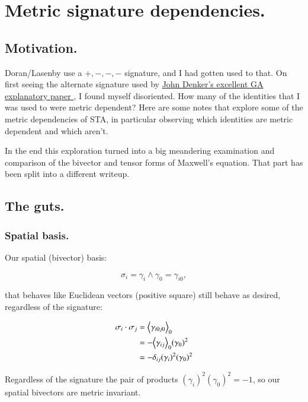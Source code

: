 \chapter{Metric signature dependencies.}

\section{Motivation. }

Doran/Lasenby use a $+,-,-,-$ signature, and I had gotten used to that.  On first seeing the alternate signature used by 
\href{http://www.av8n.com/physics/maxwell-ga.pdf}{ John Denker's excellent GA explanatory paper }, 
I found myself disoriented.  How many of the identities that I was used to were metric dependent?   Here are some notes that explore some of the
metric dependencies of STA, in particular observing which identities are metric dependent and which aren't.

In the end this exploration turned into a big meandering examination and comparison of the bivector and tensor forms of Maxwell's equation.  That part has been split into a different writeup.

\section{The guts. }

\subsection{Spatial basis. }

Our spatial (bivector) basis:

\begin{equation*}
\sigma_i = \gamma_i \wedge \gamma_0 = \gamma_{i0},
\end{equation*}

that behaves like Euclidean vectors (positive square) still behave as desired, regardless of the signature:

\begin{align*}
\sigma_i \cdot \sigma_j
&= {\left\langle{{\gamma_{i0j0}}}\right\rangle}_{0}  \\
&= - {\left\langle{{\gamma_{ij}}}\right\rangle}_{0} (\gamma_{0})^2  \\
&= -\delta_{ij} (\gamma_i)^2 (\gamma_{0})^2
\end{align*}

Regardless of the signature the pair of products $(\gamma_i)^2 (\gamma_{0})^2 = -1$, so our spatial bivectors are metric invariant.

